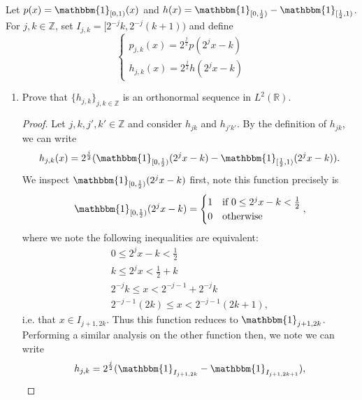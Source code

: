 \documentclass[12pt]{article}
\newenvironment{ex}[2][Exercise]{\begin{trivlist}
\item[\hskip \labelsep {\bfseries #1}\hskip \labelsep {\bfseries #2.}]}{\end{trivlist}}
\begin{document}
\begin{ex}{14}
    Let $p(x) = \mathbbm{1}_{[0,1)}(x)$ and $h(x) = \mathbbm{1}_{[0, \frac{1}{2})} -\mathbbm{1}_{[\frac{1}{2}, 1)}$. For $j, k \in \mathbb{Z}$, set $I_{j,k} = [2^{-j}k, 2^{-j}(k + 1))$ and define 
    \begin{equation*}
        \begin{cases}
            p_{j,k}(x) = 2^{\frac{j}{2}}p(2^jx - k) \\
            h_{j,k}(x) = 2^{\frac{j}{2}}h(2^jx - k)
        \end{cases}
    \end{equation*}
    \begin{enumerate}[label=14.\arabic*]
        \item Prove that $\{h_{j,k}\}_{j, k \in \mathbb{Z}}$ is an orthonormal sequence in $L^2(\mathbb{R})$.
        \begin{proof}
            Let $j, k, j', k' \in \mathbb{Z}$ and consider $h_{jk}$ and $h_{j'k'}$. By the definition of $h_{jk}$, we can write 
            $$h_{j,k}(x) = 2^{\frac{j}{2}}(\mathbbm{1}_{[0, \frac{1}{2})}(2^jx - k) - \mathbbm{1}_{[\frac{1}{2}, 1)}(2^jx - k)).$$
            We inspect $\mathbbm{1}_{[0, \frac{1}{2})}(2^jx - k)$ first, note this function precisely is 
            \begin{equation*}
                \mathbbm{1}_{[0, \frac{1}{2})}(2^jx - k) = 
                \begin{cases}
                    1 & \text{if } 0 \leq 2^jx - k < \frac{1}{2} \\
                    0 & \text{otherwise}
                \end{cases},
            \end{equation*}
            where we note the following inequalities are equivalent:
            \begin{align*}
                0 \leq 2^j x - k < \frac{1}{2} \\
                k \leq 2^j x < \frac{1}{2} + k \\
                2^{-j}k \leq x < 2^{-j - 1} + 2^{-j}k \\
                2^{-j - 1}(2k) \leq x < 2^{-j - 1}(2k + 1),
            \end{align*}
            i.e. that $x \in I_{j + 1, 2k}$. Thus this function reduces to $\mathbbm{1}_{j + 1, 2k}$. Performing a similar analysis on the other function then, we note we can write
            $$h_{j,k} = 2^{\frac{j}{2}} (\mathbbm{1}_{I_{j + 1, 2k}} - \mathbbm{1}_{I_{j + 1, 2k + 1}}),$$

\end{proof}
\end{enumerate}
\end{ex}
\end{document}
